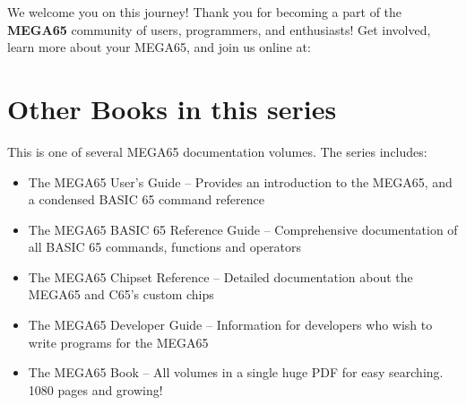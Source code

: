We welcome you on this journey! Thank you for becoming a part of the {\bf MEGA65}
community of users, programmers, and enthusiasts! Get involved, learn more
about your MEGA65, and join us online at:


\section{Other Books in this series}

This is one of several MEGA65 documentation volumes.  The series includes:

\begin{itemize}
	\item The MEGA65 User's Guide -- Provides an introduction to the MEGA65, and a condensed BASIC 65 command reference
	\item The MEGA65 BASIC 65 Reference Guide -- Comprehensive documentation of all BASIC 65 commands, functions and operators
	\item The MEGA65 Chipset Reference -- Detailed documentation about the MEGA65 and C65's custom chips
	\item The MEGA65 Developer Guide -- Information for developers who wish to write programs for the MEGA65
	\item The MEGA65 Book -- All volumes in a single huge PDF for easy searching. 1080 pages and growing!
\end{itemize}
